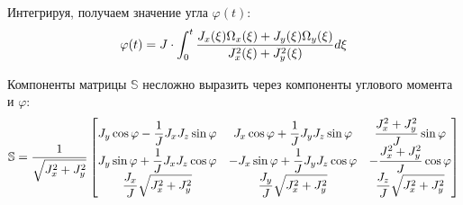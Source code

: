 \documentclass[12pt]{article}
\newcommand{\bbS}{\mathbb{S}}
\begin{document}
Интегрируя, получаем значение угла $\varphi(t)$:
\begin{gather}
	\varphi(t) = J \cdot \int_{0}^{t} \frac{J_x(\xi) \Omega_x(\xi) + J_y(\xi)\Omega_y(\xi)}{J_x^2(\xi) + J_y^2(\xi)} d\xi \notag
\end{gather}

Компоненты матрицы $\bbS$ несложно выразить через компоненты углового момента и $\varphi$:
\begin{gather}
	\bbS = \frac{1}{\sqrt{J_x^2 + J_y^2}} 
	\begin{bmatrix}
		J_y \cos \varphi - \displaystyle \frac{1}{J} J_x J_z \sin \varphi & J_x \cos \varphi + \displaystyle \frac{1}{J} J_y J_z \sin \varphi & \displaystyle \frac{J_x^2 + J_y^2}{J} \sin \varphi \\
		J_y \sin \varphi + \displaystyle \frac{1}{J} J_x J_z \cos \varphi & - J_x \sin \varphi + \displaystyle \frac{1}{J} J_y J_z \cos \varphi & - \displaystyle \frac{J_x^2 + J_y^2}{J} \cos \varphi \\
		\displaystyle \frac{J_x}{J} \sqrt{J_x^2 + J_y^2} & \displaystyle \frac{J_y}{J} \sqrt{J_x^2 + J_y^2} & \displaystyle \frac{J_z}{J} \sqrt{J_x^2 + J_y^2}
	\end{bmatrix} \notag
\end{gather}
\end{document}
